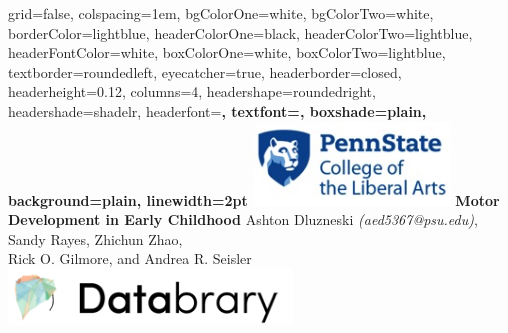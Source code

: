 \documentclass[landscape,final,paperwidth=48in,paperheight=33in,fontscale=0.285]{baposter}
\begin{document}



\begin{poster}%
  {
  grid=false,
  colspacing=1em,
  bgColorOne=white,
  bgColorTwo=white,
  borderColor=lightblue,
  headerColorOne=black,
  headerColorTwo=lightblue,
  headerFontColor=white,
  boxColorOne=white,
  boxColorTwo=lightblue,
  textborder=roundedleft,
  eyecatcher=true,
  headerborder=closed,
  headerheight=0.12\textheight,
  columns=4, %
  headershape=roundedright,
  headershade=shadelr,
  headerfont=\Large\bf\textsc, %
  textfont={\setlength{\parindent}{1.5em}},
  boxshade=plain,
  background=plain,
  linewidth=2pt
  }
  {\includegraphics[height=6em]{penn_state_cla_logo_new_210-89.jpg}}
  {\vspace{0.1em}
  \bf{Motor Development in Early Childhood} 
  \vspace{0.3em}}
  {Ashton Dluzneski \emph{(aed5367@psu.edu)}, Sandy Rayes, Zhichun Zhao,\\Rick O. Gilmore, and Andrea R. Seisler\\ \vspace{0.3em}
  }
 {\includegraphics[height=4em]{databrary.png}}


\end{poster}
\end{document}
